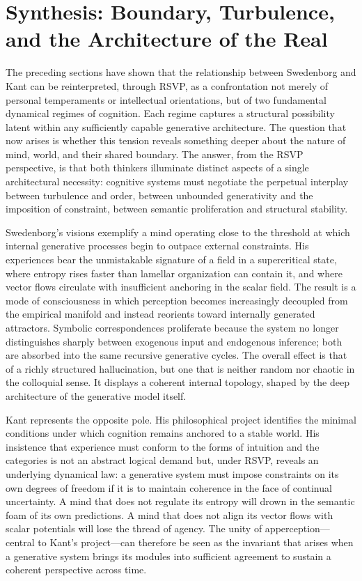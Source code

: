 \documentclass[12pt]{article}
\begin{document}
\newpage
\section{Synthesis: Boundary, Turbulence, and the Architecture of the Real}

The preceding sections have shown that the relationship between Swedenborg and 
Kant can be reinterpreted, through RSVP, as a confrontation not merely of 
personal temperaments or intellectual orientations, but of two fundamental 
dynamical regimes of cognition. Each regime captures a structural possibility 
latent within any sufficiently capable generative architecture. The question 
that now arises is whether this tension reveals something deeper about the 
nature of mind, world, and their shared boundary. The answer, from the RSVP 
perspective, is that both thinkers illuminate distinct aspects of a single 
architectural necessity: cognitive systems must negotiate the perpetual 
interplay between turbulence and order, between unbounded generativity and 
the imposition of constraint, between semantic proliferation and structural 
stability.

Swedenborg’s visions exemplify a mind operating close to the threshold at which 
internal generative processes begin to outpace external constraints. His 
experiences bear the unmistakable signature of a field in a supercritical 
state, where entropy rises faster than lamellar organization can contain it, 
and where vector flows circulate with insufficient anchoring in the scalar 
field. The result is a mode of consciousness in which perception becomes 
increasingly decoupled from the empirical manifold and instead reorients toward 
internally generated attractors. Symbolic correspondences proliferate because 
the system no longer distinguishes sharply between exogenous input and 
endogenous inference; both are absorbed into the same recursive generative 
cycles. The overall effect is that of a richly structured hallucination, but 
one that is neither random nor chaotic in the colloquial sense. It displays a 
coherent internal topology, shaped by the deep architecture of the generative 
model itself.

Kant represents the opposite pole. His philosophical project identifies the 
minimal conditions under which cognition remains anchored to a stable world.  
His insistence that experience must conform to the forms of intuition and the 
categories is not an abstract logical demand but, under RSVP, reveals an 
underlying dynamical law: a generative system must impose constraints on its 
own degrees of freedom if it is to maintain coherence in the face of continual 
uncertainty. A mind that does not regulate its entropy will drown in the 
semantic foam of its own predictions. A mind that does not align its vector 
flows with scalar potentials will lose the thread of agency. The unity of 
apperception—central to Kant’s project—can therefore be seen as the invariant 
that arises when a generative system brings its modules into sufficient 
agreement to sustain a coherent perspective across time.
\end{document}
